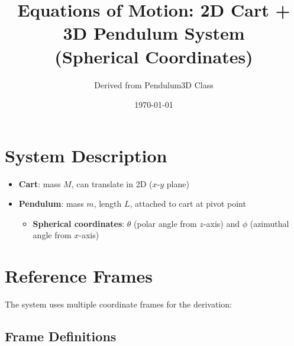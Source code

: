 \documentclass[12pt]{article}
\title{Equations of Motion: 2D Cart + 3D Pendulum System\\(Spherical Coordinates)}
\author{Derived from Pendulum3D Class}
\date{\today}
\begin{document}
\maketitle

\section{System Description}

\begin{itemize}
    \item \textbf{Cart}: mass $M$, can translate in 2D ($x$-$y$ plane)
    \item \textbf{Pendulum}: mass $m$, length $L$, attached to cart at pivot point
    \begin{itemize}
        \item \textbf{Spherical coordinates}: $\theta$ (polar angle from $z$-axis) and $\phi$ (azimuthal angle from $x$-axis)
    \end{itemize}
\end{itemize}

\section{Reference Frames}

The system uses multiple coordinate frames for the derivation:

\subsection{Frame Definitions}
\end{document}
